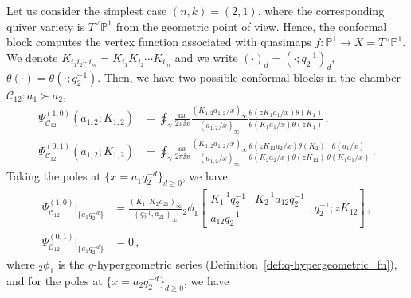 Let us consider the simplest case $(n,k) = (2,1)$, where the corresponding quiver variety is $T^\vee\mathbb{P}^1$ from the geometric point of view.
Hence, the conformal block computes the vertex function associated with quasimaps $f: \mathbb{P}^1 \to X = T^\vee\mathbb{P}^1$.
We denote $K_{i_1 i_2 \cdots i_m} = K_{i_1} K_{i_2} \cdots K_{i_m}$ and we write $(\cdot)_d = (\cdot;q_2^{-1})_d$, $\theta(\cdot) = \theta(\cdot;q_2^{-1})$.
Then, we have two possible conformal blocks in the chamber ${\mathscr{C}_{12}} : a_1 \succ a_2$, 
\begin{subequations}\label{eq:TP1_block}
\begin{align}
    \Psi_{\mathscr{C}_{12}}^{(1,0)}(a_{1,2};K_{1,2}) & = \oint_\gamma \frac{\dd{x}}{2 \pi \ii x} \frac{(K_{1,2} a_{1,2} / x)_\infty}{(a_{1,2} / x)_\infty} \frac{\theta(z K_1 a_1/x) \theta(K_1)}{\theta(K_1 a_1/x) \theta(z K_1)}
    \, , \\ 
    \Psi_{\mathscr{C}_{12}}^{(0,1)}(a_{1,2};K_{1,2}) & = \oint_\gamma \frac{\dd{x}}{2 \pi \ii x} \frac{(K_{1,2} a_{1,2} / x)_\infty}{(a_{1,2} / x)_\infty} \frac{\theta(z K_{12} a_2/x) \theta(K_2)}{\theta(K_2 a_2/x) \theta(z K_{12})} \frac{\theta(a_1/x)}{\theta(K_1 a_1 / x)}
    \, .
\end{align}
\end{subequations}
Taking the poles at $\{x = a_1 q_2^{-d}\}_{d \ge 0}$, we have
\begin{subequations}
\begin{align}
    \Psi_{\mathscr{C}_{12}}^{(1,0)}\Big|_{\{a_1 q_2^{-d}\}} 
    & = \frac{(K_1,K_2 a_{21})_\infty}{(q_2^{-1},a_{21})_\infty} {_2\phi_1}\left[ 
    \begin{matrix}
        K_1^{-1}q_2^{-1} & K_2^{-1} a_{12} q_2^{-1} \\ a_{12} q_2^{-1} & -
    \end{matrix} ; q_2^{-1}; z K_{12} \right]
    \, , \\ 
    \Psi_{\mathscr{C}_{12}}^{(0,1)}\Big|_{\{a_1 q_2^{-d}\}} & = 0 \, ,
\end{align}
\end{subequations}    
where ${}_2\phi_1$ is the $q$-hypergeometric series (Definition~\ref{def:q-hypergeometric_fn}), and for the poles at $\{x = a_2 q_2^{-d}\}_{d \ge 0}$, we have

